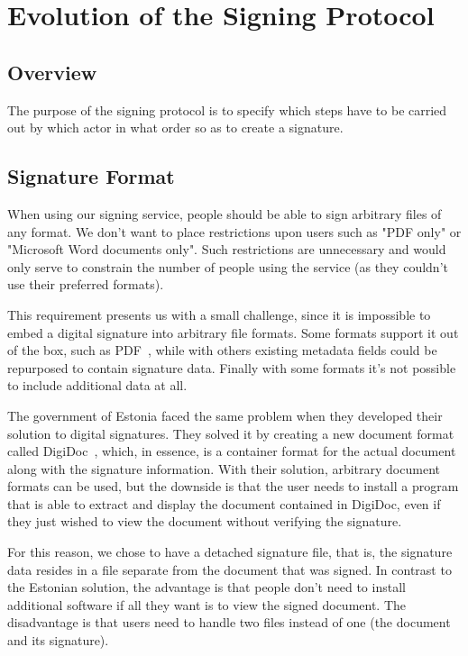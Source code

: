 \chapter{Evolution of the Signing Protocol}
\label{ch:signingprotocol}

\section{Overview}
The purpose of the signing protocol is to specify which steps have to be carried out by which actor in what
order so as to create a signature.

\section{Signature Format}
\label{sec:signatureformat}

When using our signing service, people should be able to sign arbitrary files of any format.
We don't want to place restrictions upon users such as "\gls{PDF} only" or "Microsoft Word documents only".
Such restrictions are unnecessary and would only serve to constrain the number of people using the service
(as they couldn't use their preferred formats).

This requirement presents us with a small challenge,
since it is impossible to embed a digital signature into arbitrary file formats.
Some formats support it out of the box, such as \gls{PDF}~\cite{etsipades},
while with others existing metadata fields could be repurposed to contain signature data.
Finally with some formats it's not possible to include additional data at all.

The government of Estonia faced the same problem when they developed their solution to digital signatures.
They solved it by creating a new document format called DigiDoc~\cite{digidoc},
which, in essence, is a container format for the actual document along with the signature information.
With their solution, arbitrary document formats can be used,
but the downside is that the user needs to install a program that is able to extract and display the document contained in DigiDoc,
even if they just wished to view the document without verifying the signature.

For this reason, we chose to have a detached signature file, that is,
the signature data resides in a file separate from the document that was signed.
In contrast to the Estonian solution,
the advantage is that people don't need to install additional software if all they want is to view the signed document.
The disadvantage is that users need to handle two files instead of one (the document and its signature).


